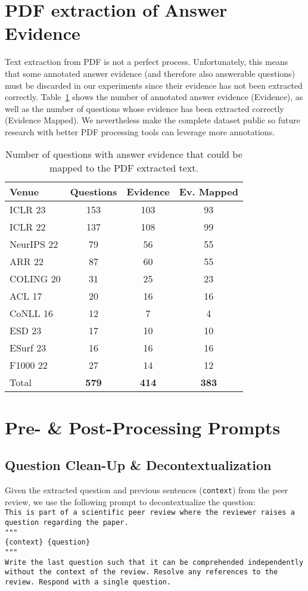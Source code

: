 \section{PDF extraction of Answer Evidence}\label{sec:appendix-dataset-numbers-with-extraxted}
Text extraction from PDF is not a perfect process. Unfortunately, this means that some annotated answer evidence (and therefore also answerable questions) must be discarded in our experiments since their evidence has not been extracted correctly. Table~\ref{tbl:dataset-numbers-with-extraxted} shows the number of annotated answer evidence (Evidence), as well as the number of questions whose evidence has been extracted correctly (Evidence Mapped). We nevertheless make the complete dataset public so future research with better PDF processing tools can leverage more annotations.
\begin{table}[!h]
\small
\centering
\begin{tabular}{@{}lccc@{}}
\toprule
Venue & Questions & Evidence & Ev. Mapped \\ \midrule

ICLR 23 & 153 & 103 & 93 \\
ICLR 22 & 137 & 108 & 99 \\
NeurIPS 22 & 79 & 56 & 55 \\ 
ARR 22 & 87 & 60 & 55 \\
COLING 20 & 31 & 25 & 23 \\
ACL 17 & 20 & 16 & 16 \\
CoNLL 16 & 12 & 7 & 4 \\
ESD 23 & 17 & 10 & 10 \\
ESurf 23 & 16 & 16 & 16 \\
F1000 22 & 27 & 14 & 12 \\
\midrule
Total & \textbf{579} & \textbf{414} & \textbf{383} \\ \bottomrule
\end{tabular}
\caption{Number of questions with answer evidence that could be mapped to the PDF extracted text.}
\label{tbl:dataset-numbers-with-extraxted}
\end{table}

\section{Pre- \& Post-Processing Prompts}
\subsection{Question Clean-Up \& Decontextualization}\label{sec:appendix-question-processing-clean-up-and-decontextualization}
Given the extracted question and previous sentences (\texttt{context}) from the peer review, we use the following prompt to decontextualize the question:\\
\texttt{This is part of a scientific peer review where the reviewer raises a question regarding the paper.\\
"""\\
\{context\} \{question\}\\
"""\\
Write the last question such that it can be comprehended independently without the context of the review. Resolve any references to the review. Respond with a single question.
}
